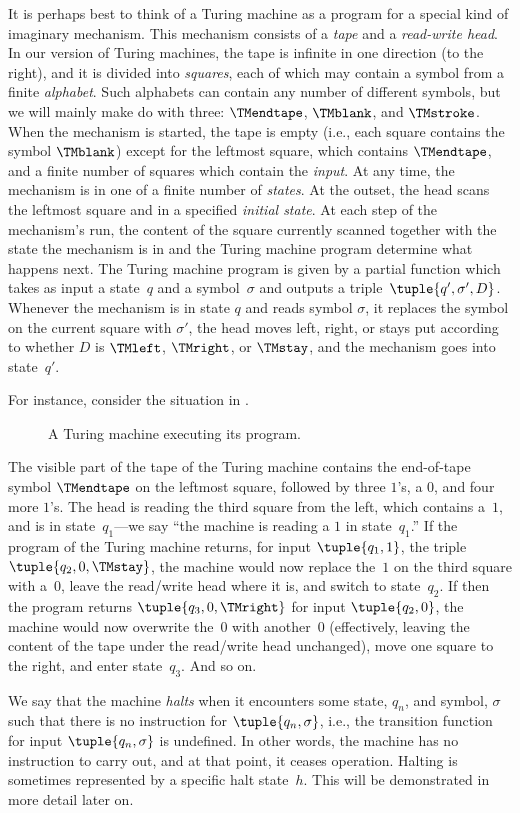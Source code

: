 \documentclass[../../../include/open-logic-section]{subfiles}
\begin{document}
\begin{explain}
It is perhaps best to think of a Turing
machine as a program for a special kind of imaginary mechanism. This
mechanism consists of a \emph{tape} and a \emph{read-write head}. In
our version of Turing machines, the tape is infinite in one direction
(to the right), and it is divided into \emph{squares}, each of which
may contain a symbol from a finite \emph{alphabet}. Such alphabets can
contain any number of different symbols, but we will mainly make do
with three: $\TMendtape$, $\TMblank$, and $\TMstroke$. When the
mechanism is started, the tape is empty (i.e., each square contains
the symbol $\TMblank$) except for the leftmost square, which contains
$\TMendtape$, and a finite number of squares which contain the
\emph{input}. At any time, the mechanism is in one of a finite number
of \emph{states}. At the outset, the head scans the leftmost square
and in a specified \emph{initial state}. At each step of the
mechanism's run, the content of the square currently scanned together
with the state the mechanism is in and the Turing machine program
determine what happens next. The Turing machine program is given by a
partial function which takes as input a state~$q$ and a
symbol~$\sigma$ and outputs a triple~$\tuple{q', \sigma',
  D}$. Whenever the mechanism is in state $q$ and reads symbol
$\sigma$, it replaces the symbol on the current square with $\sigma'$,
the head moves left, right, or stays put according to whether $D$ is
$\TMleft$, $\TMright$, or $\TMstay$, and the mechanism goes into
state~$q'$.

For instance, consider the situation in .
\begin{figure}
  \centering
  \caption{A Turing machine executing its program.}
\end{figure}
The visible part of the tape of the Turing machine contains the
end-of-tape symbol $\TMendtape$ on the leftmost square, followed by
three $1$'s, a $0$, and four more $1$'s.  The
head is reading the third square from the left, which contains
a~$1$, and is in state~$q_1$---we say ``the machine is reading
a $1$ in state~$q_1$.'' If the program of the Turing machine
returns, for input $\tuple{q_1, 1}$, the triple $\tuple{q_2,
0, \TMstay}$, the machine would now replace the~$1$ on
the third square with a~$0$, leave the read/write head where it
is, and switch to state~$q_2$.  If then the program returns
$\tuple{q_3, 0, \TMright}$ for input $\tuple{q_2, 0}$,
the machine would now overwrite the~$0$ with another~$0$
(effectively, leaving the content of the tape under the read/write
head unchanged), move one square to the right, and enter state~$q_3$.
And so on.

We say that the machine \emph{halts} when it encounters some state,
$q_n$, and symbol, $\sigma$ such that there is no instruction for
$\tuple{q_n, \sigma}$, i.e., the transition function for input
$\tuple{q_n,\sigma}$ is undefined. In other words, the machine has no
instruction to carry out, and at that point, it ceases
operation. Halting is sometimes represented by a specific halt
state~$h$.  This will be demonstrated in more detail later on.
\end{explain}
\end{document}
